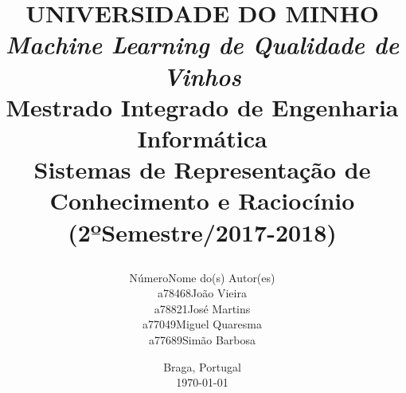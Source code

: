\documentclass{article}
\begin{document}
\title{\Huge
       \textbf{UNIVERSIDADE DO MINHO}\\
       \vspace*{3cm}
       \huge
       \textbf{\textit{Machine Learning de Qualidade de Vinhos}\\
       \vspace*{3cm}
       \large
       Mestrado Integrado de Engenharia Informática\\
       \vspace*{2cm}
       Sistemas de Representação de Conhecimento e Raciocínio\\
       (2ºSemestre/2017-2018)
       \vspace*{\fill}}

\author{\hspace*{-5cm}Número\hspace*{1cm}Nome do(s) Autor(es)\hspace*{\fill}\\
        \hspace*{-5cm}a78468\hspace*{1cm}João Vieira\hspace*{\fill}\\
        \hspace*{-5cm}a78821\hspace*{1cm}José Martins\hspace*{\fill}\\
        \hspace*{-5cm}a77049\hspace*{1cm}Miguel Quaresma\hspace*{\fill}\\
        \hspace*{-5cm}a77689\hspace*{1cm}Simão Barbosa\hspace*{\fill}}

\date{\hspace*{\fill}Braga, Portugal\hspace*{1cm}\\
      \hspace*{\fill}\today\hspace*{1cm}}

\maketitle

\newpage

\justify

\vspace*{\fill}
}
\end{document}
